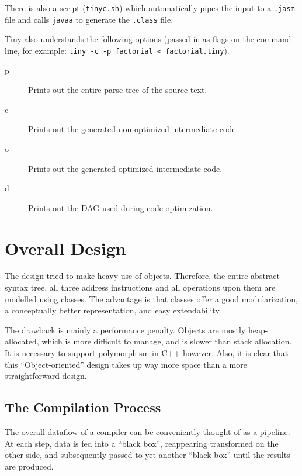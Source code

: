 \documentclass[a4paper]{article}
\begin{document}
There is also a script (\texttt{tinyc.sh}) which automatically pipes the input
to a \texttt{.jasm} file and calls \texttt{javaa} to generate the
\texttt{.class} file.

Tiny also understands the following options (passed in as flags on the
command-line, for example: \texttt{tiny -c -p factorial < factorial.tiny}).

\begin{description}
\item[p] Prints out the entire parse-tree of the source text.
\item[c] Prints out the generated non-optimized intermediate code.
\item[o] Prints out the generated optimized intermediate code.
\item[d] Prints out the DAG used during code optimization.
\end{description}

\section{Overall Design}

The design tried to make heavy use of objects. Therefore, the entire abstract
syntax tree, all three address instructions and all operations upon them are
modelled using classes. The advantage is that classes offer a good
modularization, a conceptually better representation, and easy extendability.

The drawback is mainly a performance penalty. Objects are mostly
heap-allocated, which is more difficult to manage, and is slower than stack
allocation. It is necessary to support polymorphism in C++ however.
Also, it is clear that this ``Object-oriented'' design takes up
way more space than a more straightforward design.

\subsection{The Compilation Process}

The overall dataflow of a compiler can be conveniently thought of as a
pipeline. At each step, data is fed into a ``black box'', reappearing
transformed on the other side, and subsequently passed to yet another ``black
box'' until the results are produced.
\end{document}
